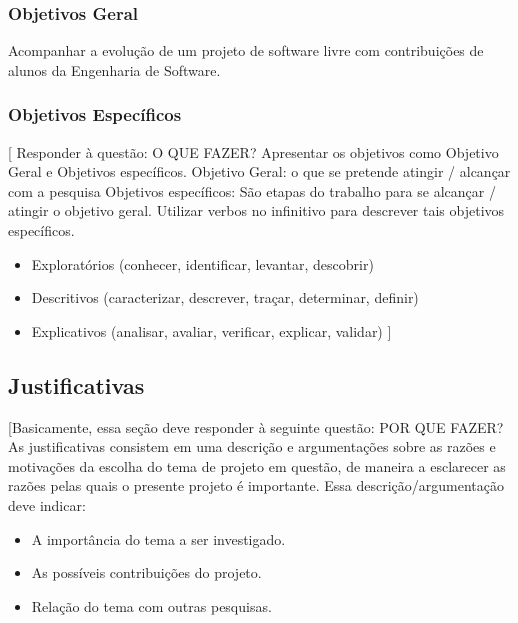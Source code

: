 \subsubsection{Objetivos Geral}

Acompanhar a evolução de um projeto de software livre com contribuições de alunos
da Engenharia de Software.

\subsubsection{Objetivos Específicos}
[ Responder à questão: O QUE FAZER?
Apresentar os objetivos como Objetivo Geral e Objetivos específicos.
Objetivo Geral: o que se pretende atingir / alcançar com a pesquisa
Objetivos específicos: São etapas do trabalho para se alcançar / atingir o objetivo geral. Utilizar verbos no infinitivo para descrever tais objetivos específicos.
\begin{itemize}
	\item Exploratórios (conhecer, identificar, levantar, descobrir)
	\item Descritivos (caracterizar, descrever, traçar, determinar, definir)
	\item Explicativos (analisar, avaliar, verificar, explicar, validar)   ]
\end{itemize}


\subsection{Justificativas} %
\label{sub:justificativas}

[Basicamente, essa seção deve responder à seguinte questão: POR QUE FAZER?
As justificativas consistem em uma descrição e argumentações sobre as razões e motivações da escolha do tema de projeto em questão, de maneira a esclarecer as razões pelas quais o presente projeto é importante.
Essa descrição/argumentação deve indicar:
\begin{itemize}
	\item A importância do tema a ser investigado.
	\item As possíveis contribuições do projeto.
	\item Relação do tema com outras pesquisas.
\end{itemize}
